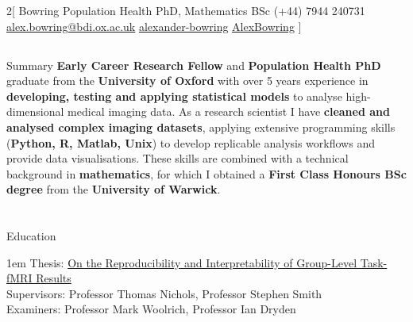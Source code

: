 \documentclass{my_cv}
\begin{document}
\begin{multicols}{2}[
        {Bowring}%
        {Population Health PhD, Mathematics BSc}%
        {(+44) 7944 240731}%
        {\href{mailto:alex.bowring@bdi.ox.ac.uk}{alex.bowring@bdi.ox.ac.uk}}%
        {\href{https://www.linkedin.com/in/alexander-bowring/}{alexander-bowring}}%
        {\href{https://github.com/AlexBowring/}{AlexBowring}}
]

\end{multicols}

\vspace{-1.7cm}
\begin{tcolorbox}[colback=white,colframe=cyan,width=\dimexpr\textwidth+12mm\relax,enlarge left by=-6mm]
\section{\faStickyNote}{Summary}
\textbf{Early Career Research Fellow} and \textbf{Population Health PhD} graduate from the \textbf{University of Oxford} with over 5 years experience in \textbf{developing, testing and applying statistical models} to analyse high-dimensional medical imaging data. As a research scientist I have \textbf{cleaned and analysed complex imaging datasets}, applying extensive programming skills (\textbf{Python, R, Matlab, Unix}) to develop replicable analysis workflows and provide data visualisations. These skills are combined with a technical background in \textbf{mathematics}, for which I obtained a \textbf{First Class Honours BSc degree} from the \textbf{University of Warwick}. 
  
\end{tcolorbox}


\section{\faGraduationCap}{Education}

%
{\begin{addmargin}[2em]{1em}
    Thesis: \href{https://doi.org/10.31237/osf.io/mj7qa}{On the Reproducibility and Interpretability of Group-Level Task-fMRI Results} \\
    Supervisors: Professor Thomas Nichols, Professor Stephen Smith \\
    Examiners: Professor Mark Woolrich, Professor Ian Dryden 
\end{addmargin}}
    
\end{document}
